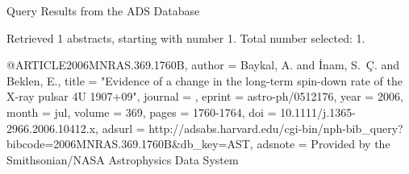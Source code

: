Query Results from the ADS Database


Retrieved 1 abstracts, starting with number 1.  Total number selected: 1.

@ARTICLE{2006MNRAS.369.1760B,
   author = {{Baykal}, A. and {{\.I}nam}, S.~{\c C}. and {Beklen}, E.},
    title = "{Evidence of a change in the long-term spin-down rate of the X-ray pulsar 4U 1907+09}",
  journal = {\mnras},
   eprint = {astro-ph/0512176},
     year = 2006,
    month = jul,
   volume = 369,
    pages = {1760-1764},
      doi = {10.1111/j.1365-2966.2006.10412.x},
   adsurl = {http://adsabs.harvard.edu/cgi-bin/nph-bib_query?bibcode=2006MNRAS.369.1760B&db_key=AST},
  adsnote = {Provided by the Smithsonian/NASA Astrophysics Data System}
}


